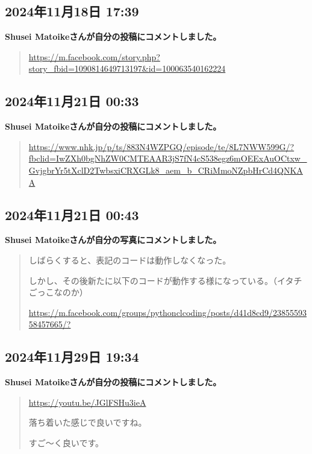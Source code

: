 \subsection*{2024年11月18日 17:39}

\textbf{Shusei Matoikeさんが自分の投稿にコメントしました。}

\begin{quote}
\url{https://m.facebook.com/story.php?story_fbid=1090814649713197&id=100063540162224}
\end{quote}

\subsection*{2024年11月21日 00:33}

\textbf{Shusei Matoikeさんが自分の投稿にコメントしました。}

\begin{quote}
\url{https://www.nhk.jp/p/ts/883N4WZPGQ/episode/te/8L7NWW599G/?fbclid=IwZXh0bgNhZW0CMTEAAR3jS7fN4cS538egz6mOEExAuOCtxw_GvjgbrYr5tXclD2TwbsxiCRXGLk8_aem_b_CRiMmoNZpbHrCd4QNKAA}
\end{quote}

\subsection*{2024年11月21日 00:43}

\textbf{Shusei Matoikeさんが自分の写真にコメントしました。}

\begin{quote}
しばらくすると、表記のコードは動作しなくなった。

しかし、その後新たに以下のコードが動作する様になっている。（イタチごっこなのか）

\url{https://m.facebook.com/groups/pythonclcoding/posts/d41d8cd9/2385559358457665/?}
\end{quote}

\subsection*{2024年11月29日 19:34}

\textbf{Shusei Matoikeさんが自分の投稿にコメントしました。}

\begin{quote}
\url{https://youtu.be/JGlFSHu3ieA}

落ち着いた感じで良いですね。

すご〜く良いです。
\end{quote}

